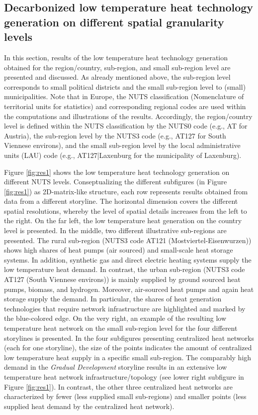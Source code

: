 \subsection{Decarbonized low temperature heat technology generation on different spatial granularity levels}\label{res:2}
In this section, results of the low temperature heat technology generation obtained for the region/country, sub-region, and small sub-region level are presented and discussed. As already mentioned above, the sub-region level corresponds to small political districts and the small sub-region level to (small) municipalities. Note that in Europe, the NUTS classification (Nomenclature of territorial units for statistics) and corresponding regional codes are used within the computations and illustrations of the results. Accordingly, the region/country level is defined within the NUTS classification by the NUTS0 code (e.g., AT for Austria), the sub-region level by the NUTS3 code (e.g., AT127 for South Viennese environs), and the small sub-region level by the local administrative units (LAU) code (e.g., AT127|Laxenburg for the municipality of Laxenburg).\newline

Figure \ref{fig:res1} shows the low temperature heat technology generation on different NUTS levels. Conseptualizing the different subfigures (in Figure \ref{fig:res1}) as 2D-matrix-like structure, each row represents results obtained from data from a different storyline. The horizontal dimension covers the different spatial resolutions, whereby the level of spatial details increases from the left to the right. On the far left, the low temperature heat generation on the country level is presented. In the middle, two different illustrative sub-regions are presented. The rural sub-region (NUTS3 code AT121 (Mostviertel-Eisenwurzen)) shows high shares of heat pumps (air sourced) and small-scale heat storage systems. In addition, synthetic gas and direct electric heating systems supply the low temperature heat demand. In contrast, the urban sub-region (NUTS3 code AT127 (South Viennese environs)) is mainly supplied by ground sourced heat pumps, biomass, and hydrogen. Moreover, air-sourced heat pumps and again heat storage supply the demand. In particular, the shares of heat generation technologies that require network infrastructure are highlighted and marked by the blue-colored edge. On the very right, an example of the resulting low temperature heat network on the small sub-region level for the four different storylines is presented. In the four subfigures presenting centralized heat networks (each for one storyline), the size of the points indicates the amount of centralized low temperature heat supply in a specific small sub-region. The comparably high demand in the \textit{Gradual Development} storyline results in an extensive low temperature heat network infrastructure/topology (see lower right subfigure in Figure \ref{fig:res1}). In contrast, the other three centralized heat networks are characterized by fewer (less supplied small sub-regions) and smaller points (less supplied heat demand by the centralized heat network).

